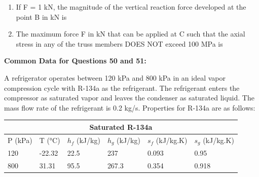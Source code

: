 \documentclass[journal,11pt,onecolumn]{IEEEtran}
\begin{document}
\begin{enumerate}[resume]

    \item If F = 1 kN, the magnitude of the vertical reaction force developed at the point B in kN is

          \begin{enumerate}
          \end{enumerate}

    \item The maximum force F in kN that can be applied at C such that the axial stress in any of the truss members DOES NOT exceed 100 MPa is

          \begin{enumerate}
          \end{enumerate}

\end{enumerate}

\normalsize\textbf{Common Data for Questions 50 and 51:}

A refrigerator operates between 120 kPa and 800 kPa in an ideal vapor compression cycle with R-134a as the refrigerant. The refrigerant enters the compressor as saturated vapor and leaves the condenser as saturated liquid. The mass flow rate of the refrigerant is 0.2 kg/s. Properties for R-134a are as follows:

\begin{table}[H]
    \centering
    \begin{tabular}{|l|l|l|l|l|l|}
        \hline
        \multicolumn{6}{|c|}{\textbf{Saturated R-134a}}                                              \\
        \hline
        P (kPa) & T (°C) & \(h_f\) (kJ/kg) & \(h_g\) (kJ/kg) & \(s_f\) (kJ/kg.K) & \(s_g\) (kJ/kg.K) \\
        \hline
        120     & -22.32 & 22.5            & 237             & 0.093             & 0.95              \\
        800     & 31.31  & 95.5            & 267.3           & 0.354             & 0.918             \\
        \hline
    \end{tabular}
\end{table}
\end{document}
